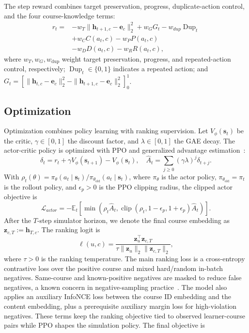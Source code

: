 \documentclass[letterpaper]{article}
\begin{document}
The step reward combines target preservation, progress, duplicate-action control, and the four course-knowledge terms:
\begin{align}
r_t=&-w_T\|\mathbf{h}_{t+1,c}-\mathbf{e}_c\|_2^2
+w_G G_t-w_{dup}\operatorname{Dup}_t \nonumber\\
&+w_C C(a_t,c)-w_P P(a_t,c) \nonumber\\
&-w_D D(a_t,c)-w_R R(a_t,c),
\end{align}
where \(w_T,w_G,w_{\mathrm{dup}}\) weight target preservation, progress, and repeated-action control, respectively; \(\operatorname{Dup}_t\in\{0,1\}\) indicates a repeated action; and \(G_t=[\|\mathbf{h}_{t,c}-\mathbf{e}_c\|_2^2-\|\mathbf{h}_{t+1,c}-\mathbf{e}_c\|_2^2]_0^1\).

\subsection{Optimization}
Optimization combines policy learning with ranking supervision. Let \(V_\phi(\mathbf{s}_t)\) be the critic, \(\gamma\in[0,1]\) the discount factor, and \(\lambda\in[0,1]\) the GAE decay. The actor-critic policy is optimized with PPO and generalized advantage estimation~\cite{schulman2017ppo,schulman2015gae}:
\begin{equation}
\delta_t=r_t+\gamma V_\phi(\mathbf{s}_{t+1})-V_\phi(\mathbf{s}_t),
\quad
\hat{A}_t=\sum_{j\geq 0}(\gamma\lambda)^j\delta_{t+j}.
\end{equation}
With \(\rho_t(\theta)=\pi_\theta(a_t\mid\mathbf{s}_t)/\pi_{\theta_{\mathrm{old}}}(a_t\mid\mathbf{s}_t)\), where \(\pi_\theta\) is the actor policy, \(\pi_{\theta_{\mathrm{old}}}=\pi_t\) is the rollout policy, and \(\epsilon_p>0\) is the PPO clipping radius, the clipped actor objective is
\begin{equation}
\mathcal{L}_{actor}=
-\mathbb{E}_t\left[
\min(\rho_t\hat{A}_t,
\operatorname{clip}(\rho_t,1-\epsilon_p,1+\epsilon_p)\hat{A}_t)
\right].
\end{equation}
After the \(T\)-step simulator horizon, we denote the final course embedding as \(\mathbf{z}_{c,T}:=\mathbf{h}_{T,c}\). The ranking logit is
\begin{equation}
\ell(u,c)=\frac{\mathbf{z}_u^\top\mathbf{z}_{c,T}}
{\tau\|\mathbf{z}_u\|_2\|\mathbf{z}_{c,T}\|_2},
\label{eq:ranking-logit}
\end{equation}
where \(\tau>0\) is the ranking temperature. The main ranking loss is a cross-entropy contrastive loss over the positive course and mixed hard/random in-batch negatives. Same-course and known-positive negatives are masked to reduce false negatives, a known concern in negative-sampling practice~\cite{ma2026negative}. The model also applies an auxiliary InfoNCE loss between the course ID embedding and the content embedding, plus a prerequisite auxiliary margin loss for high-violation negatives. These terms keep the ranking objective tied to observed learner-course pairs while PPO shapes the simulation policy. The final objective is
\end{document}

